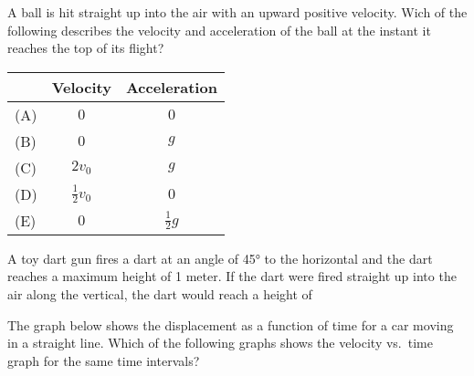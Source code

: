 \documentclass{../../../oss-classkick-exam}
\begin{document}
\begin{multicols*}{2}
\begin{questions}
    
    \question A ball is hit straight up into the air with an upward positive
    velocity. Wich of the following describes the velocity and acceleration
    of the ball at the instant it reaches the top of its flight?
  
    \begin{tabular}{lcc}
      & Velocity & Acceleration\\ \hline
      (A) & $0$ & $0$\\
      (B) & $0$ & $g$\\
      (C) & $2v_0$ & $g$\\
      (D) & $\frac12v_0$ & $0$\\
      (E) & $0$ & $\frac12g$
    \end{tabular}
    \vspace{.7in}
    \columnbreak
  
    \question A toy dart gun fires a dart at an angle of \ang{45} to the
    horizontal and the dart reaches a maximum height of 1 meter. If the dart
    were fired straight up into the air along the vertical, the dart would
    reach a height of
    
    \question The graph below shows the displacement as a function of time for a
    car moving in a straight line. Which of the following graphs shows the
    velocity vs.\ time graph for the same time intervals?
    \begin{center}
    \end{center}
    \\
    \newpage
  

\end{questions}
\end{multicols*}
\end{document}
